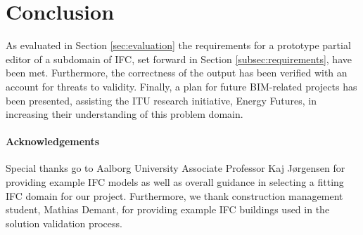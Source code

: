 \section{Conclusion}
As evaluated in Section \ref{sec:evaluation} the requirements for a prototype partial editor of a subdomain of IFC, set forward in Section \ref{subsec:requirements}, have been met. Furthermore, the correctness of the output has been verified with an account for threats to validity. Finally, a plan for future BIM-related projects has been presented, assisting the ITU research initiative, Energy Futures, in increasing their understanding of this problem domain. 

\label{sec:conclusion}
\paragraph{Acknowledgements} Special thanks go to Aalborg University Associate Professor Kaj Jørgensen for providing example IFC models as well as overall guidance in selecting a fitting IFC domain for our project. Furthermore, we thank construction management student, Mathias Demant, for providing example IFC buildings used in the solution validation process.